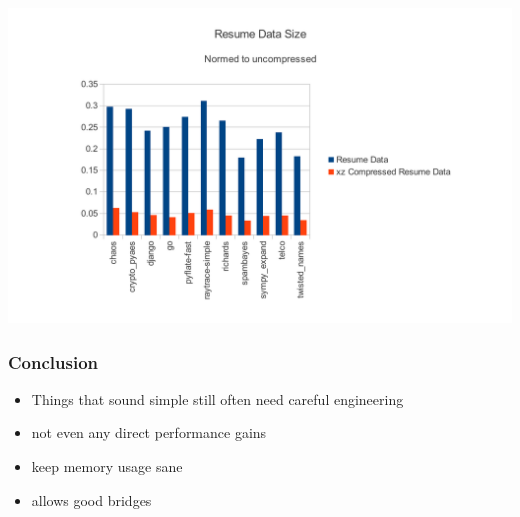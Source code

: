 \documentclass[utf8x]{beamer}
\begin{document}
\begin{frame}
  \includegraphics[scale=0.6]{figures/resume_data_size}
\end{frame}

\begin{frame}
  \frametitle{Conclusion}
  \begin{itemize}
      \item Things that sound simple still often need careful engineering
      \pause
      \item not even any direct performance gains
      \item keep memory usage sane
      \item allows good bridges
  \end{itemize}
\end{frame}


\end{document}
